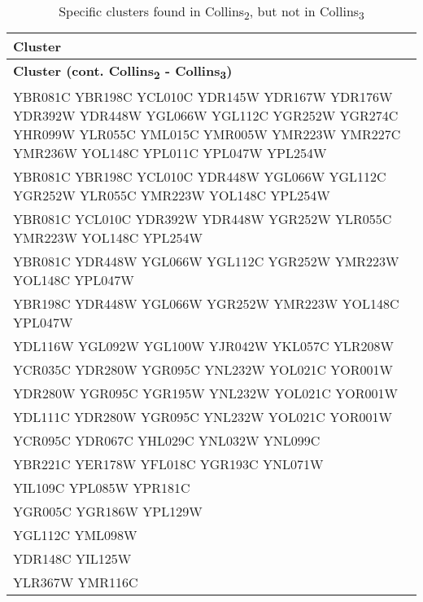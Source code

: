 \setlength{\extrarowheight}{2pt}
\renewcommand{\arraystretch}{1.2}
\begin{longtable}{| m{27em} |}
\caption{Specific clusters found in Collins\textsubscript{2}, but not in Collins\textsubscript{3}} \\
\hline
\textbf{Cluster} \\
\hline
\endfirsthead
\hline
\textbf{Cluster (cont. Collins\textsubscript{2} - Collins\textsubscript{3})} \\
\hline
\endhead
\hline
\endfoot
\hline
\endlastfoot
YBR081C YBR198C YCL010C YDR145W YDR167W YDR176W YDR392W YDR448W YGL066W YGL112C YGR252W YGR274C YHR099W YLR055C YML015C YMR005W YMR223W YMR227C YMR236W YOL148C YPL011C YPL047W YPL254W \\
\hline
YBR081C YBR198C YCL010C YDR448W YGL066W YGL112C YGR252W YLR055C YMR223W YOL148C YPL254W \\
\hline
YBR081C YCL010C YDR392W YDR448W YGR252W YLR055C YMR223W YOL148C YPL254W \\
\hline
YBR081C YDR448W YGL066W YGL112C YGR252W YMR223W YOL148C YPL047W \\
\hline
YBR198C YDR448W YGL066W YGR252W YMR223W YOL148C YPL047W \\
\hline
YDL116W YGL092W YGL100W YJR042W YKL057C YLR208W \\
\hline
YCR035C YDR280W YGR095C YNL232W YOL021C YOR001W \\
\hline
YDR280W YGR095C YGR195W YNL232W YOL021C YOR001W \\
\hline
YDL111C YDR280W YGR095C YNL232W YOL021C YOR001W \\
\hline
YCR095C YDR067C YHL029C YNL032W YNL099C \\
\hline
YBR221C YER178W YFL018C YGR193C YNL071W \\
\hline
YIL109C YPL085W YPR181C \\
\hline
YGR005C YGR186W YPL129W \\
\hline
YGL112C YML098W \\
\hline
YDR148C YIL125W \\
\hline
YLR367W YMR116C \\
\hline
\end{longtable}